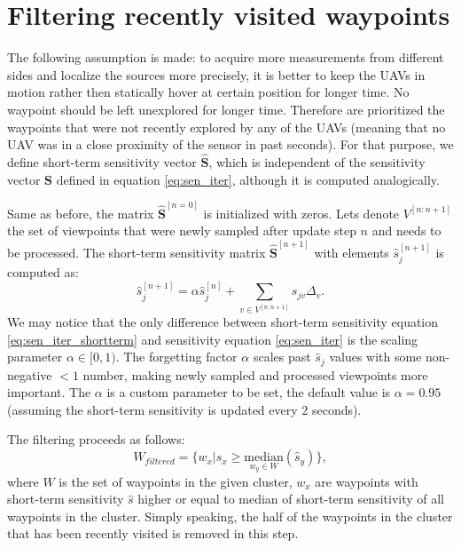 \section{Filtering recently visited waypoints}%
The following assumption is made:
to acquire more measurements from different sides and localize the sources more precisely, it is better to keep the \ac{UAV}s in motion rather then statically hover at certain position for longer time.
No waypoint should be left unexplored for longer time.
Therefore are prioritized the waypoints that were not recently explored by any of the \ac{UAV}s (meaning that no \ac{UAV} was in a close proximity of the sensor in past seconds).
For that purpose, we define short-term sensitivity vector $\mathbf{\hat{S}}$, which is independent of the sensitivity vector $\mathbf{S}$ defined in equation \ref{eq:sen_iter}, 
although it is computed analogically.

Same as before, the matrix $\mathbf{\hat{S}}^{[n = 0]}$ is initialized with zeros.
Lets denote $V^{[n:n+1]}$ the set of viewpoints that were newly sampled after update step $n$ and needs to be processed. 
The short-term sensitivity matrix $\mathbf{\hat{S}}^{[n+1]}$ with elements $\hat{s}_{j}^{[n+1]}$ is computed as:
\begin{equation}
  \hat{s}_{j}^{[n+1]} = \alpha \hat{s}_{j}^{[n]} + \sum_{v \in V^{[n:n+1]}} s_{jv} \Delta_{v}. 
  \label{eq:sen_iter_shortterm}
\end{equation}
We may notice that the only difference between short-term sensitivity equation \ref{eq:sen_iter_shortterm} and sensitivity equation \ref{eq:sen_iter} is the scaling parameter $\alpha \in [0, 1)$.
The forgetting factor $\alpha$ scales past $\hat{s}_{j}$ values with some non-negative $<1$ number, making newly sampled and processed viewpoints more important.
The $\alpha$ is a custom parameter to be set, the default value is $\alpha = 0.95$ (assuming the short-term sensitivity is updated every $2$ seconds).%

The filtering proceeds as follows:
\begin{equation}
  W_{filtered} = \{w_{x} | \hat{s}_{x} \ge \underset{w_{y} \in W}{\mathrm{median}}(\hat{s}_{y})\},
\end{equation}
where $W$ is the set of waypoints in the given cluster, $w_{x}$ are waypoints with short-term sensitivity $\hat{s}$ higher or equal to median of short-term sensitivity of all waypoints in the cluster.
Simply speaking, the half of the waypoints in the cluster that has been recently visited is removed in this step.
